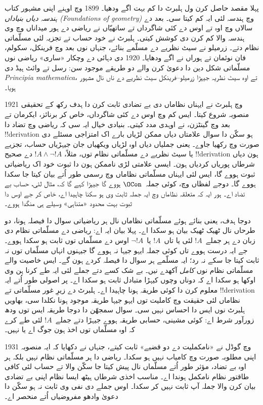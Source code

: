\documentclass[../../../include/open-logic-section]{subfiles}
\begin{document}
پہلا مقصد حاصل کرن ول ہلبرٹ دا
کم بہت اگے ودھیا۔ 1899 وچ اوہنے
اپنی مشہور کتاب
\emph{ہندسہ دیاں بنیاداں (Foundations of geometry)}
وچ ہندسہ لئی ایہ کم کیتا سی۔ بعد
دے سالاں وچ اوہ تے اوس دے کئی
شاگرداں تے ساتھیّاں نے ریاضی
دے ہور میداناں وچ وی ہندسہ
والا کم کرن دی کوشش کیتی۔
ہلبرٹ نے خود حساب تے تجزیہ
لئی مسلّماتی نظام دتے۔ زرمیلو
نے سیٹ نظریے دے مسلّمے بنائے،
جنہاں نوں بعد وچ فرینکل،
سکولم، فان نوئمان تے ہوراں
نے اگے ودھایا۔ 1920 دی
دہائی دے وچکار «ساری» ریاضی
نوں مسلّماتی شکل دین دا دعویٰ
کرن والے دو طریقے موجود سن:
رسل تے وائٹ ہیڈ دی
\emph{Principia mathematica}،
تے اوہ سیٹ نظریہ جیہڑا
زرمیلو--فرینکل سیٹ نظریے
دے ناں نال مشہور ہویا۔

1921 وچ ہلبرٹ نے ایہناں
نظاماں دی بے تضادی ثابت
کرن دا ہدف رکھ کے تحقیقی
منصوبہ شروع کیتا۔ ایس
کم وچ اوس دے کئی شاگرداں،
خاص کر برنائز، ایکرمان
تے بعد وچ گینٹزن، نے
اوہدی مدد کیتی۔ بنیادی
خیال ایہ سی کہ ریاضی وچ
تضاد دا !!{derivation} ہو سکّن
دا سوال علامتاں دیاں ممکن
لڑیاں بارے اک امتزاجی مسئلے
دی صورت وچ رکھیا جاوے۔ یعنی
جملیاں دیاں اوہ لڑیاں ویکھیاں
جان جیہڑیاں حساب،
تجزیے یا سیٹ نظریے دے
مسلّماتی نظام توں،
مثلاً، $!A \land
\lnot !A$ دے صحیح
!!{derivation} ہون دیاں
شرطاں پوریاں کردیاں
ہون۔ ایسی علامتی لڑی
ناممکن ہون دا ثبوت
خود اک ریاضیاتی ثبوت
ہووے گا، ایس لئی
ایہناں مسلّماتی نظاماں
وچ رسمی طور اُتے
بیان کیتا جا سکدا
ہووے گا۔ دوجے لفظاں
وچ، کوئی جملہ~$\OCon$
ہووے گا جیہڑا کہے
گا کہ، مثال لئی،
حساب بے تضاد اے۔
ہور ایہ کہ متعلقہ
نظاماں وچ ایہ جملہ
ثابت وی ہو سکنا
چاہیدا اے، خاص کر
جے اوس دا ثبوت
بہت محدود «متناہی»
وسیلے ہی منگدا ہووے۔

دوجا ہدف، یعنی بنائے
ہوئے مسلّماتی نظاماں
نال ہر ریاضیاتی سوال
دا فیصلہ ہونا، دو طرحاں
نال ٹھیک ٹھیک بیان
ہو سکدا اے۔ پہلا بیان
ایہ اے: ریاضی دے مسلّماتی
نظام دی زبان دے ہر
جملے~$!A$ لئی یا
تاں~$!A$ یا~$\lnot !A$
اوس دے مسلّماں توں
ثابت ہو سکدا ہووے۔
جے ایہ درست ہووے
تاں کوئی جملہ ایہو
جیہا نہ ہووے گا
جیہنوں انہاں مسلّماں
توں نہ ثابت کیتا
جا سکے نہ رد؛
ایہ مسلّمے ہر سوال
دا فیصلہ کردے
ہون گے۔ ایس خاصیت
والے مسلّماتی نظام
نوں \emph{کامل}
آکھدے نیں۔ بے شک
کسے دتے جملے لئی
ایہ طے کرنا ہن وی
اوکھا ہو سکدا اے
کہ دوناں وچوں
کیہڑا متبادل ثابت ہو سکدا اے۔
پر اصولی طور اُتے
ایہ معلوم کرن دا
کوئی طریقہ ہونا
چاہیدا اے۔ ہلبرٹ
دے زیرِ غور مسلّماتی
تے !!{derivation}
نظاماں لئی حقیقت
وچ کاملیت توں
ایہو جیہا طریقہ
موجود ہونا نکلدا
سی، بھاویں ہلبرٹ
نوں ایس دا احساس
نہیں سی۔ سوال
سمجھّن دا دوجا
طریقہ ایس توں
ودھ زورآور شرط
اے: کوئی مشینی،
حسابی طریقہ ہووے
جیہڑا دتے جملے~$!A$
لئی طے کرے کہ
اوہ مسلّماں توں
اخذ ہون جوگ اے
یا نہیں۔

1931 وچ گوڈل نے
«نامکملیت دے دو قضیے»
ثابت کیتے، جنہاں
نے دکھایا کہ ایہ
منصوبہ اپنی مطلوبہ
صورت وچ کامیاب
نہیں ہو سکدا۔
ریاضی دا ہر مسلّماتی
نظام نہیں بلکہ
ہر اوہ بے تضاد،
مؤثر طور اُتے
مسلّماں نال پیش
کیتا جا سکّن
والا تے حساب
لئی کافی طاقتور
نظام نامکمل ہوندا
اے۔ مناسب اخذی
شرطاں ہیٹھ ایسا
نظام اپنی بے
تضادی بیان کرن
والا جملہ آپ
ثابت نہیں کر
سکدا۔ اوس جملے
دی نفی وی ثابت
نہ ہو سکّن دا
دعویٰ وادھو
مفروضیاں اُتے
منحصر اے۔
\end{document}
